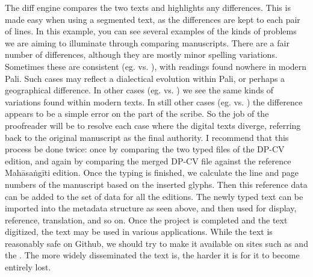 {}\markdownRendererInterblockSeparator
{}The diff engine compares the two texts and highlights any differences. This is made easy when using a segmented text, as the differences are kept to each pair of lines.\markdownRendererInterblockSeparator
{}In this example, you can see several examples of the kinds of problems we are aiming to illuminate through comparing manuscripts. There are a fair number of differences, although they are mostly minor spelling variations. Sometimes these are consistent (eg.  vs. ), with readings found nowhere in modern Pali. Such cases may reflect a dialectical evolution within Pali, or perhaps a geographical difference. In other cases (eg.  vs. ) we see the same kinds of variations found within modern texts. In still other cases (eg.  vs. ) the difference appears to be a simple error on the part of the scribe.\markdownRendererInterblockSeparator
{}So the job of the proofreader will be to resolve each case where the digital texts diverge, referring back to the original manuscript as the final authority.\markdownRendererInterblockSeparator
{}I recommend that this process be done twice: once by comparing the two typed files of the DP-CV edition, and again by comparing the merged DP-CV file against the reference Mahāsaṅgīti edition.\markdownRendererInterblockSeparator
{}Once the typing is finished, we calculate the line and page numbers of the manuscript based on the inserted glyphs. Then this reference data can be added to the set of data for all the editions. The newly typed text can be imported into the metadata structure as seen above, and then used for display, reference, translation, and so on.\markdownRendererInterblockSeparator
{}\markdownRendererInterblockSeparator
{}Once the project is completed and the text digitized, the text may be used in various applications. While the text is reasonably safe on Github, we should try to make it available on sites such as  and the . The more widely disseminated the text is, the harder it is for it to become entirely lost.\markdownRendererInterblockSeparator
